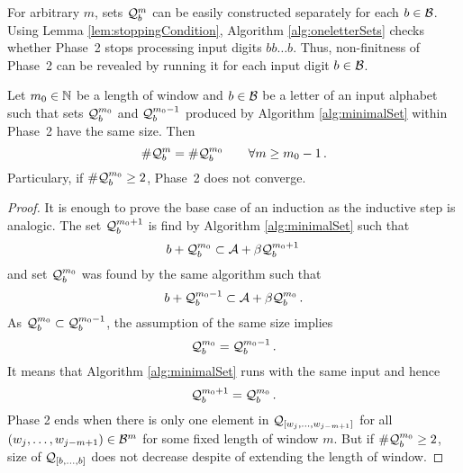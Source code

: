For arbitrary $m$, sets $\mathcal{Q}^m_b$  can be easily constructed separately for each $b\in\mathcal{B}$. Using Lemma \ref{lem:stoppingCondition}, Algorithm \ref{alg:oneletterSets} checks whether Phase~2 stops processing input digits $bb\dots b$. Thus,  non-finitness of Phase~2 can be revealed by running it for each input digit $b\in\mathcal{B}$.
\begin{lem}
\label{lem:stoppingCondition}
Let $m_0 \in \mathbb{N}$ be a length of window and $b\in\mathcal{B}$ be a letter of an input alphabet such that sets $\mathcal{Q}^{m_0}_b$ and $\mathcal{Q}^{{m_0}-1}_b$ produced by Algorithm \ref{alg:minimalSet} within Phase~2 have the same size. Then
$$
    \#\mathcal{Q}^m_b = \#\mathcal{Q}^{m_0}_b \qquad \forall m\geq m_0-1\,.
$$ 
Particulary, if $\#\mathcal{Q}^{m_0}_b\geq 2$, Phase~2 does not converge.
\end{lem}
\begin{proof}
It is enough to prove the base case of an induction as the inductive step is analogic. The set $\mathcal{Q}^{m_0+1}_b$ is find by Algorithm \ref{alg:minimalSet} such that 
$$
b + \mathcal{Q}^{m_0}_b \subset \mathcal{A} + \beta \mathcal{Q}^{m_0+1}_b\,
$$
and set $\mathcal{Q}^{m_0}_b$ was found by the same algorithm such that
$$
b + \mathcal{Q}^{m_0-1}_b \subset \mathcal{A} + \beta \mathcal{Q}^{m_0}_b\,.
$$
As $\mathcal{Q}^{m_0}_b \subset \mathcal{Q}^{{m_0}-1}_b$, the assumption of the same size implies
$$
    \mathcal{Q}^{m_0}_b = \mathcal{Q}^{{m_0}-1}_b\,.
$$
It means that Algorithm \ref{alg:minimalSet} runs with the same input and hence
$$
\mathcal{Q}^{m_0+1}_b=\mathcal{Q}^{m_0}_b\,.
$$
Phase 2 ends when there is only one element in $\mathcal{Q}_{[w_j,\dots, w_{j-m+1}]}$ for all $(w_j,\dots, w_{j-m+1}) \in \mathcal{B}^m$ for some fixed length of window $m$. But if $\#\mathcal{Q}^{m_0}_b\geq 2$, size of $\mathcal{Q}_{[b,\dots,b]}$ does not decrease despite of extending the length of window.
\end{proof}
